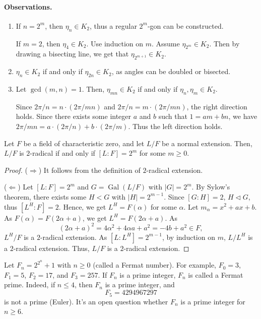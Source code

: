 \documentclass[twoside]{article}
\DeclareMathOperator\Gal{Gal}
\theoremstyle{remark}
\newcounter{theorem}
\begin{document}
\paragraph{Observations.}
\begin{enumerate}
  \item If \(n = 2^m\), then \(\eta_n \in K_2\), thus a regular \(2^m\)-gon can be constructed. \par
  If \(m=2\), then \(\eta_4 \in K_2\). Use induction on \(m\). Assume \(\eta_{2^m} \in K_2\). Then by drawing a bisecting line, we get that \(\eta_{2^{m+1}} \in K_2\).
  
  \item \(\eta_n \in K_2\) if and only if \(\eta_{2n} \in K_2\), as angles can be doubled or bisected.
  
  \item Let \(\gcd(m,n) = 1\). Then, \(\eta_{mn} \in K_2\) if and only if \(\eta_n, \eta_m \in K_2\). \par
  Since \(2\pi/n = n \cdot (2\pi/mn)\) and \(2\pi/n = m \cdot (2\pi/mn)\), the right direction holds. Since there exists some integer \(a\) and \(b\) such that \(1=am+bn\), we have \(2\pi/mn = a \cdot (2\pi/n) + b \cdot (2\pi/m)\). Thus the left direction holds.
\end{enumerate}

\begin{lemma}
  Let \(F\) be a field of characteristic zero, and let \(L/F\) be a normal extension. Then, \(L/F\) is \(2\)-radical if and only if \([L:F] = 2^m\) for some \(m \geq 0\).
\end{lemma}

\begin{proof}
  (\(\Rightarrow\)) It follows from the definition of \(2\)-radical extension.
  
  (\(\Leftarrow\)) Let \([L:F] = 2^m\) and \(G = \Gal(L/F)\) with \(|G| = 2^m\). By Sylow's theorem, there exists some \(H < G\) with \(|H| = 2^{m-1}\). Since \([G:H] = 2\), \(H \vartriangleleft G\), thus \([L^H:F] = 2\). Hence, we get \(L^H = F(\alpha)\) for some \(\alpha\). Let \(m_\alpha = x^2 + ax + b\). As \(F(\alpha) = F(2\alpha+a)\), we get \(L^H = F(2\alpha+a)\). As
  \[ (2\alpha+a)^2 = 4\alpha^2 + 4\alpha a + a^2 = -4b+a^2 \in F, \]
  \(L^H/F\) is a \(2\)-radical extension. As \([L:L^H] = 2^{m-1}\), by induction on \(m\), \(L/L^H\) is a \(2\)-radical extension. Thus, \(L/F\) is a \(2\)-radical extension.
\end{proof}

Let \(F_n = 2^{2^n} + 1\) with \(n \geq 0\) (called a Fermat number). For example, \(F_0 = 3\), \(F_1 = 5\), \(F_2 = 17\), and \(F_3 = 257\). If \(F_n\) is a prime integer, \(F_n\) is called a Fermat prime. Indeed, if \(n \leq 4\), then \(F_n\) is a prime integer, and
\[ F_5 = 4294967297 \]
is not a prime (Euler). It's an open question whether \(F_n\) is a prime integer for \(n \geq 6\).
\end{document}
